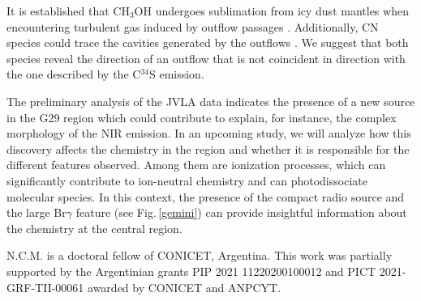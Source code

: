 \documentclass[baaa]{baaa}
\begin{document}
It is established that CH$_{3}$OH undergoes sublimation from icy dust mantles when encountering turbulent gas induced by outflow passages \citep{disho}. Additionally, CN species could trace the cavities generated by the outflows \citep{ortega23}. We suggest that both species reveal the direction of an outflow that is not coincident in direction with the one described by the C$^{34}$S emission.

The preliminary analysis of the JVLA data indicates the presence of a new source in the G29 region which could contribute to explain, for instance, the complex morphology of the NIR emission. In an upcoming study, we will analyze how this discovery affects the chemistry in the region and whether it is responsible for the different features observed. Among them are ionization processes, which can significantly contribute to ion-neutral chemistry and can photodissociate molecular species. In this context, the presence of the compact radio source and the large Br$\gamma$ feature (see Fig.\,\ref{gemini}) can provide insightful information about the chemistry at the central region. 




\begin{acknowledgement}
N.C.M. is a doctoral fellow of CONICET, Argentina. This work was partially supported by the Argentinian grants PIP 2021 11220200100012
and PICT 2021-GRF-TII-00061
awarded by CONICET
and ANPCYT.
\end{acknowledgement}



\small

\end{document}
